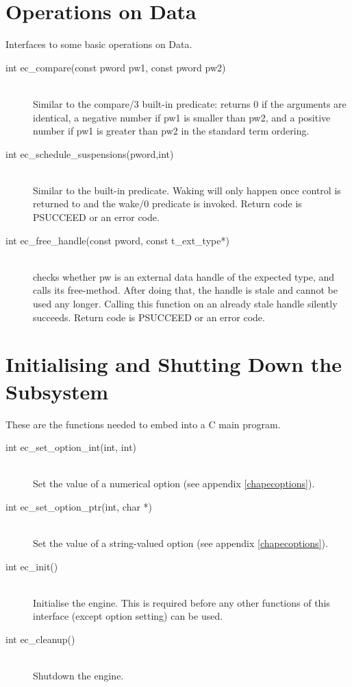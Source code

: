 \section{Operations on {\eclipse} Data}
Interfaces to some basic operations on {\eclipse} Data.
\begin{description}
\item[int		ec_compare(const pword pw1, const pword pw2)]\ \\
	Similar to the compare/3 built-in predicate:
	returns 0 if the arguments are identical,
	a negative number if pw1 is smaller than pw2,
	and a positive number if pw1 is greater than pw2
	in the standard term ordering.

\item[int		ec_schedule_suspensions(pword,int)]\ \\
	Similar to the
	built-in predicate.
	Waking will only happen once control is returned to {\eclipse}
	and the wake/0 predicate is invoked.
	Return code is PSUCCEED or an error code.

\item[int		ec_free_handle(const pword, const t_ext_type*)]\ \\
	checks whether pw is an {\eclipse} external data handle of the
	expected type, and calls its free-method. After doing that, the
	handle is stale and cannot be used any longer. Calling this function
	on an already stale handle silently succeeds.
	Return code is PSUCCEED or an error code.

\end{description}


\section{Initialising and Shutting Down the {\eclipse} Subsystem}
These are the functions needed to embed {\eclipse} into a C main program.
\begin{description}
\item[int		ec_set_option_int(int, int)]\ \\
	Set the value of a numerical option (see appendix \ref{chapecoptions}).

\item[int		ec_set_option_ptr(int, char *)]\ \\
	Set the value of a string-valued option (see appendix \ref{chapecoptions}).

\item[int		ec_init()]\ \\
	Initialise the {\eclipse} engine. This is required before any other
	functions of this interface (except option setting) can be used.

\item[int		ec_cleanup()]\ \\
	Shutdown the {\eclipse} engine.
\end{description}


